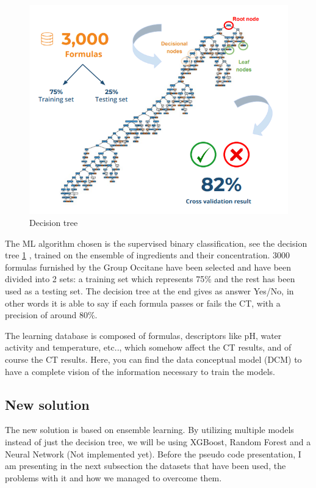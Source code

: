 \documentclass[a4paper,12pt,twoside]{report}
\begin{document}
\begin{figure}
		\includegraphics[width=\textwidth]{images/binaryTree}
	\caption[Current Decision Tree for CT prediction]{Decision tree}
\label{Decision tree}
\end{figure}
The ML algorithm chosen is the supervised binary classification, see the decision tree \ref{Decision tree} , trained on the ensemble of ingredients and their concentration. 3000 formulas furnished by the Group Occitane have been selected and have been divided into 2 sets: a training set which represents 75\% and the rest has been used as a testing set.
The decision tree at the end gives as answer Yes/No, in other words it is able to say if each formula passes or fails the CT, with a precision of around 80\%.

The learning database is composed of formulas, descriptors like pH, water activity and temperature, etc.., which somehow affect the CT results, and of course the CT results. Here, you can find the data conceptual model (DCM) to have a complete vision of the information necessary to train the models.
\subsection{New solution}
The new solution is based on ensemble learning. By utilizing multiple models instead of just the decision tree, we will be using XGBoost, Random Forest and a Neural Network (Not implemented yet). Before the pseudo code presentation, I am presenting in the next subsection the datasets that have been used, the problems with it and how we managed to overcome them.
\end{document}
